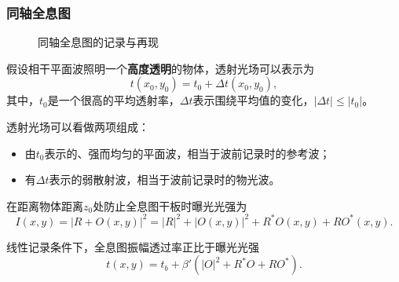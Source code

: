 \documentclass[UTF8]{ctexart}
\begin{document}
\subsubsection{同轴全息图}
\begin{figure}[htbp]
    \centering
    \caption{同轴全息图的记录与再现}
\end{figure}
假设相干平面波照明一个\textbf{高度透明}的物体，透射光场可以表示为
\begin{equation}
    t\left( x_0,y_0 \right) = t_0 + \Delta t \left( x_0,y_0 \right),
\end{equation}
其中，$t_0$是一个很高的平均透射率，$\Delta t$表示围绕平均值的变化，$\left|\Delta t\right|\le\left|t_0\right|$。

透射光场可以看做两项组成：
\begin{itemize}
    \item 由$t_0$表示的、强而均匀的平面波，相当于波前记录时的参考波；
    \item 有$\Delta t$表示的弱散射波，相当于波前记录时的物光波。
\end{itemize}

在距离物体距离$z_0$处防止全息图干板时曝光光强为
\begin{equation}
    I\left( x,y \right) = \left|R + O \left( x,y \right)\right|^2 = \left|R\right|^2 + \left|O\left( x,y \right)\right|^2 + R^*O\left( x,y \right) + RO^*\left( x,y \right).
\end{equation}

线性记录条件下，全息图振幅透过率正比于曝光光强
\begin{equation}
    t\left( x,y \right) = t_b + \beta'\left( \left|O\right|^2 + R^*O + RO^* \right).
\end{equation}
\end{document}
